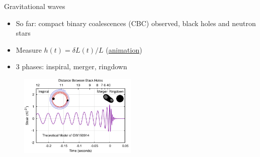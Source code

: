 \documentclass[usenames,dvipsnames,t]{beamer}
\begin{document}
\begin{frame}{Gravitational waves}

  \def\x{3mm}

\begin{itemize}
  \item So far: compact binary coalescences (CBC) observed, black holes and neutron stars
  
  \vspace{\x}

  \item Measure  $h(t) = \delta L(t) / L$ (\href{https://www.youtube.com/watch?v=UA1qG7Fjc2A}{animation})
  
  \vspace{\x}

  \item 3 phases: inspiral, merger, ringdown
\end{itemize}

\begin{figure}[H]
  \centering
  \includegraphics[width=0.5\textwidth]{Figures/GW150914.jpeg}
\end{figure}
\end{frame}
\end{document}
